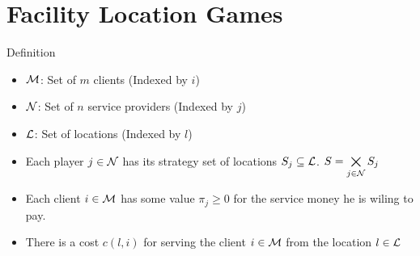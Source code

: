 \documentclass[aspectratio=1610,handout]{beamer}
\begin{document}
\section{Facility Location Games}

\begin{frame}{Definition}
	\begin{itemize}
		\item $\mathcal{M}$: Set of $m$ clients (Indexed by $i$)
		\item $\mathcal{N}$: Set of $n$ service providers (Indexed by $j$)
		\item $\mathcal{L}$: Set of locations (Indexed by $l$)\pause
		
        \item Each player $j\in \mathcal{N}$ has its strategy set of locations $S_j\subseteq \mathcal{L}$. $S=\bigtimes\limits_{j\in\mathcal{N}}S_j$\pause
		
        \item Each client $i\in \mathcal{M}$ has some value $\pi_j\geq 0$ for the service money he is wiling to pay.\pause
        
        \item There is a cost $c(l,i)$ for serving the client $i\in\mathcal{M}$ from the location $l\in\mathcal{L}$
	\end{itemize}


\end{frame}
\end{document}
